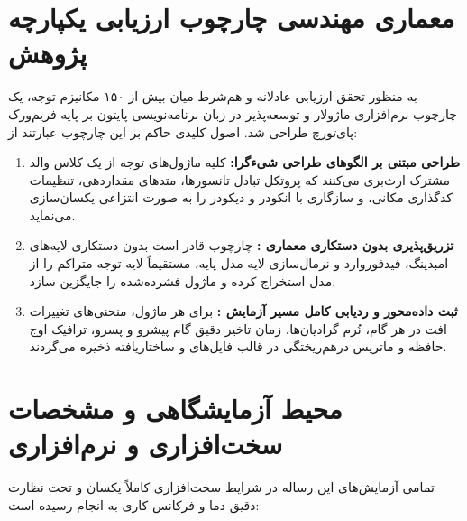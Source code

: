 \documentclass[12pt,a4paper]{report}
\theoremstyle{definition}
\begin{document}
\section{معماری مهندسی چارچوب ارزیابی یکپارچه پژوهش}
به منظور تحقق ارزیابی عادلانه و هم‌شرط  میان بیش از ۱۵۰ مکانیزم توجه، یک چارچوب نرم‌افزاری ماژولار و توسعه‌پذیر در زبان برنامه‌نویسی پایتون بر پایه فریم‌ورک پای‌تورچ  طراحی شد. اصول کلیدی حاکم بر این چارچوب عبارتند از:
\begin{enumerate}
    \item \textbf{طراحی مبتنی بر الگوهای طراحی شیءگرا:} کلیه ماژول‌های توجه از یک کلاس والد مشترک  ارث‌بری می‌کنند که پروتکل تبادل تانسورها، متدهای مقداردهی، تنظیمات کدگذاری مکانی، و سازگاری با انکودر و دیکودر را به صورت انتزاعی یکسان‌سازی می‌نماید.
    \item \textbf{تزریق‌پذیری بدون دستکاری معماری :} چارچوب قادر است بدون دستکاری لایه‌های امبدینگ، فیدفوروارد  و نرمال‌سازی لایه  مدل پایه، مستقیماً لایه توجه متراکم را از مدل استخراج کرده و ماژول فشرده‌شده را جایگزین سازد.
    \item \textbf{ثبت داده‌محور و ردیابی کامل مسیر آزمایش :} برای هر ماژول، منحنی‌های تغییرات افت  در هر گام، نُرم گرادیان‌ها، زمان تاخیر دقیق گام پیشرو و پسرو، ترافیک اوج حافظه و ماتریس درهم‌ریختگی در قالب فایل‌های  و  ساختاریافته ذخیره می‌گردند.
\end{enumerate}

\section{محیط آزمایشگاهی و مشخصات سخت‌افزاری و نرم‌افزاری}
تمامی آزمایش‌های این رساله در شرایط سخت‌افزاری کاملاً یکسان و تحت نظارت دقیق دما و فرکانس کاری به انجام رسیده است:
\end{document}
